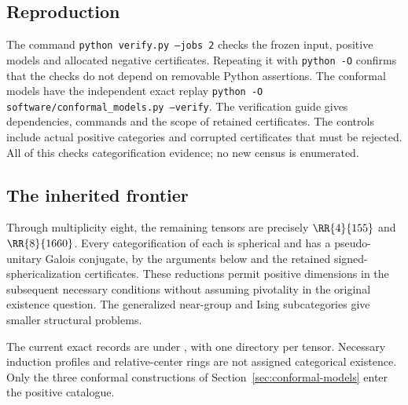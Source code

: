 \subsection{Reproduction}\label{sec:reproduction}\label{sec:frontier}
The command \texttt{python verify.py --jobs 2} checks the frozen input,
positive models and allocated negative certificates. Repeating it with
\texttt{python -O} confirms that the checks do not depend on removable
Python assertions. The conformal models have the independent exact
replay \texttt{python -O software/conformal\_models.py --verify}.
The verification guide gives dependencies, commands and the scope of
retained certificates. The controls include actual positive categories
and corrupted certificates that must be rejected. All of this checks
categorification evidence; no new census is enumerated.

\subsection{The inherited frontier}\label{sec:research-coverage}
Through multiplicity eight, the remaining tensors are precisely
$\RR{4}{155}$ and $\RR{8}{1660}$. Every categorification of each is spherical and has a
pseudo-unitary Galois conjugate, by the arguments below and the retained
signed-sphericalization certificates. These reductions permit positive
dimensions in the subsequent necessary conditions without assuming
pivotality in the original existence question. The generalized near-group
and Ising subcategories give smaller structural problems.

The current exact records are under ,
with one directory per tensor. Necessary induction profiles and
relative-center rings are not assigned categorical existence. Only the
three conformal constructions of Section~\ref{sec:conformal-models}
enter the positive catalogue.





